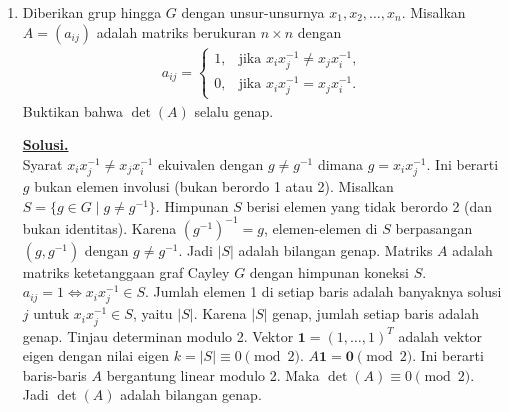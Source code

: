 \documentclass[12pt,twoside]{article}
\newenvironment{solution}
{
	\par\noindent\textbf{\underline{Solusi.}}\\
}
{
	\par
}
\begin{document}
\begin{enumerate}
\begin{solution}
          \textbf{(b)} Matriks tak simetrik yang memenuhi $B^2 = B^T$.
          Kita cari matriks yang tidak diagonalisable di $\mathbb{R}$. Nilai eigennya harus kompleks, memenuhi $\lambda^4 = \lambda$.
          Ambil $\lambda = e^{i 2\pi/3} = -\frac{1}{2} + i\frac{\sqrt{3}}{2}$.
          Matriks rotasi $120^\circ$ merepresentasikan bilangan kompleks ini dalam basis real:
          \[ B = \begin{pmatrix} -1/2 & -\sqrt{3}/2 \\ \sqrt{3}/2 & -1/2 \end{pmatrix}. \]
          Cek $B^2$ (rotasi $240^\circ$): $\begin{pmatrix} -1/2 & \sqrt{3}/2 \\ -\sqrt{3}/2 & -1/2 \end{pmatrix}$.
          Cek $B^T$: $\begin{pmatrix} -1/2 & \sqrt{3}/2 \\ -\sqrt{3}/2 & -1/2 \end{pmatrix}$.
          Terlihat $B^2 = B^T$, namun $B$ tidak simetrik (karena $b_{12} \neq b_{21}$).
        \end{solution}
  \item Diberikan grup hingga $G$ dengan unsur-unsurnya $x_1,x_2,\dots,x_n$. Misalkan $A=(a_{ij})$ adalah matriks berukuran $n\times n$ dengan
        \begin{align*}
          a_{ij}=\begin{cases}
                   1, & \text{jika } x_ix_j^{-1} \neq x_jx_i^{-1}, \\
                   0, & \text{jika } x_ix_j^{-1} = x_jx_i^{-1}.
                 \end{cases}
        \end{align*}
        Buktikan bahwa $\det(A)$ selalu genap.
        \begin{solution}
          Syarat $x_i x_j^{-1} \neq x_j x_i^{-1}$ ekuivalen dengan $g \neq g^{-1}$ dimana $g = x_i x_j^{-1}$.
          Ini berarti $g$ bukan elemen involusi (bukan berordo 1 atau 2).
          Misalkan $S = \{g \in G \mid g \neq g^{-1}\}$. Himpunan $S$ berisi elemen yang tidak berordo 2 (dan bukan identitas).
          Karena $(g^{-1})^{-1} = g$, elemen-elemen di $S$ berpasangan $(g, g^{-1})$ dengan $g \neq g^{-1}$.
          Jadi $|S|$ adalah bilangan genap.
          Matriks $A$ adalah matriks ketetanggaan graf Cayley $G$ dengan himpunan koneksi $S$.
          $a_{ij} = 1 \iff x_i x_j^{-1} \in S$.
          Jumlah elemen 1 di setiap baris adalah banyaknya solusi $j$ untuk $x_i x_j^{-1} \in S$, yaitu $|S|$.
          Karena $|S|$ genap, jumlah setiap baris adalah genap.
          Tinjau determinan modulo 2.
          Vektor $\mathbf{1} = (1, \dots, 1)^T$ adalah vektor eigen dengan nilai eigen $k = |S| \equiv 0 \pmod 2$.
          $A \mathbf{1} = \mathbf{0} \pmod 2$.
          Ini berarti baris-baris $A$ bergantung linear modulo 2.
          Maka $\det(A) \equiv 0 \pmod 2$.
          Jadi $\det(A)$ adalah bilangan genap.
        \end{solution}
\end{enumerate}
\pagebreak
\end{document}

